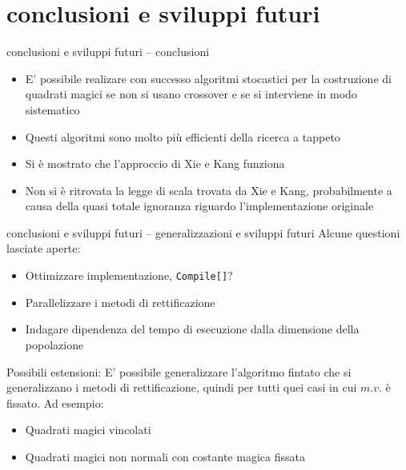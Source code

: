 \documentclass[10pt]{beamer}
\begin{document}
\section{conclusioni e sviluppi futuri}

\begin{frame}{conclusioni e sviluppi futuri -- conclusioni}
		\begin{itemize}
			\item \alert{E' possibile} realizare con successo algoritmi stocastici per la costruzione di quadrati magici se non si usano crossover e se si interviene in modo sistematico
			\item Questi algoritmi sono molto più efficienti della ricerca a tappeto
			\item Si è mostrato che l'approccio di Xie e Kang \alert{funziona}
			\item \alert{Non} si è ritrovata la legge di scala trovata da Xie e Kang, probabilmente a causa della quasi totale ignoranza riguardo l'implementazione originale
		\end{itemize}
\end{frame}

\begin{frame}{conclusioni e sviluppi futuri -- generalizzazioni e sviluppi futuri}
	Alcune questioni lasciate aperte:
	\begin{itemize}
		\item Ottimizzare implementazione, \texttt{Compile[]}?
		\item Parallelizzare i metodi di rettificazione
		\item Indagare dipendenza del tempo di esecuzione dalla dimensione della popolazione
	\end{itemize}
	Possibili estensioni:
	E' possibile generalizzare l'algoritmo fintato che si generalizzano i metodi di rettificazione, quindi per tutti quei casi in cui $ m.v. $ è fissato.
	Ad esempio:
	\begin{itemize}
		\item Quadrati magici vincolati
		\item Quadrati magici non normali con costante magica fissata
	\end{itemize}
\end{frame}
\end{document}
